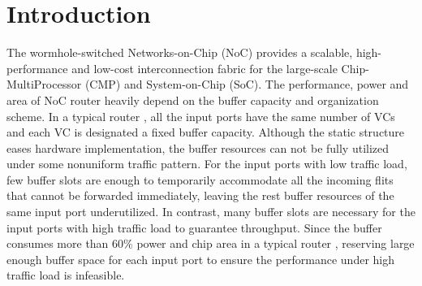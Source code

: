 \documentclass[10pt,conference]{IEEEtran}
\begin{document}
\section{Introduction}
The wormhole-switched Networks-on-Chip (NoC) provides a scalable, high-performance and low-cost interconnection fabric for the large-scale Chip-MultiProcessor (CMP) and System-on-Chip (SoC). The performance, power and area of NoC router heavily depend on the buffer capacity and organization scheme. In a typical router \cite{DaTo01}, all the input ports have the same number of VCs and each VC is designated a fixed buffer capacity. Although the static structure eases hardware implementation, the buffer resources can not be fully utilized under some nonuniform traffic pattern. For the input ports with low traffic load, few buffer slots are enough to temporarily accommodate all the incoming flits that cannot be forwarded immediately, leaving the rest buffer resources of the same input port underutilized. In contrast, many buffer slots are necessary for the input ports with high traffic load to guarantee throughput. Since the buffer consumes more than 60\% power and chip area in a typical router \cite{1650108}\cite{ChPe03}, reserving large enough buffer space for each input port to ensure the performance under high traffic load is infeasible.

\end{document}
